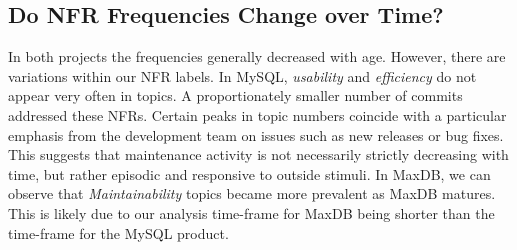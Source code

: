 \documentclass[smallextended]{svjour3}       %
\newcommand{\XXX}[1]{\textcolor{red}{{\it \textbf{[XXX: #1]}}}}
\begin{document}

\subsection{Do NFR Frequencies Change over Time?}
In both projects the frequencies generally decreased with age. 
However, there are variations within our NFR labels. In MySQL, \emph{usability} and \emph{efficiency} do not appear very often in topics. 
A proportionately smaller number of commits addressed these NFRs.
Certain peaks in topic numbers coincide with a particular emphasis from the development team on issues such as new releases or bug fixes.
This suggests that maintenance activity is not necessarily strictly decreasing with time, but rather episodic and responsive to outside stimuli. 
In MaxDB, we can observe that \emph{Maintainability} topics became more prevalent as MaxDB matures. 
This is likely due to our analysis time-frame for MaxDB being shorter than the time-frame for the MySQL product. 

\balance
\newpage
\end{document}
